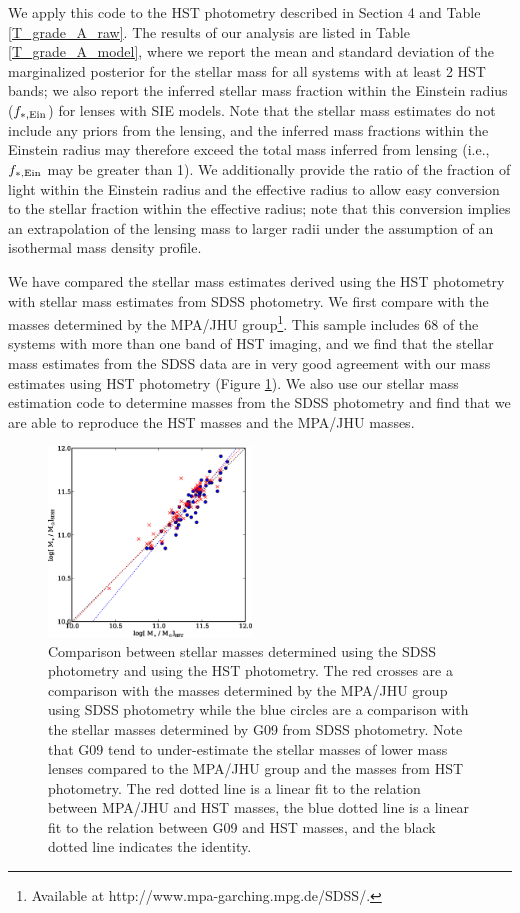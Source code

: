 \documentclass[iop]{emulateapj}
\begin{document}
We apply this code to the HST photometry described in Section 4 and Table \ref{T_grade_A_raw}. The results of our analysis are listed in Table \ref{T_grade_A_model}, where we report the mean and standard deviation of the marginalized posterior for the stellar mass for all systems with at least 2 HST bands; we also report the inferred stellar mass fraction within the Einstein radius ($f_{\rm *,Ein}$) for lenses with SIE models. Note that the stellar mass estimates do not include any priors from the lensing, and the inferred mass fractions within the Einstein radius may therefore exceed the total mass inferred from lensing (i.e., $f_{\rm *,Ein}$ may be greater than 1). We additionally provide the ratio of the fraction of light within the Einstein radius and the effective radius to allow easy conversion to the stellar fraction within the effective radius; note that this conversion implies an extrapolation of the lensing mass to larger radii under the assumption of an isothermal mass density profile.

We have compared the stellar mass estimates derived using the HST photometry with stellar mass estimates from SDSS photometry. We first compare with the masses determined by the MPA/JHU group\footnote{Available at http://www.mpa-garching.mpg.de/SDSS/.}. This sample includes 68 of the systems with more than one band of HST imaging, and we find that the stellar mass estimates from the SDSS data are in very good agreement with our mass estimates using HST photometry (Figure \ref{F_mass_photometry_comparisons}). We also use our stellar mass estimation code to determine masses from the SDSS photometry and find that we are able to reproduce the HST masses and the MPA/JHU masses.

\begin{figure}[ht]
 \centering
 \includegraphics[width=0.48\textwidth,clip]{f6.eps}
 \caption{Comparison between stellar masses determined using the SDSS photometry and using the HST photometry. The red crosses are a comparison with the masses determined by the MPA/JHU group using SDSS photometry while the blue circles are a comparison with the stellar masses determined by G09 from SDSS photometry. Note that G09 tend to under-estimate the stellar masses of lower mass lenses compared to the MPA/JHU group and the masses from HST photometry. The red dotted line is a linear fit to the relation between MPA/JHU and HST masses, the blue dotted line is a linear fit to the relation between G09 and HST masses, and the black dotted line indicates the identity.}
 \label{F_mass_photometry_comparisons}
\end{figure}
\end{document}
